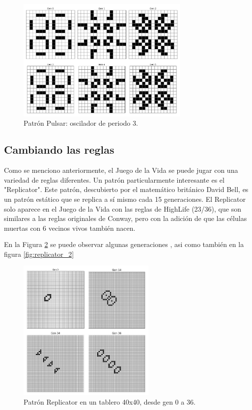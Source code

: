 \documentclass[]{article}
\begin{document}
\begin{figure}[H]
  \centering
  \includegraphics[width=0.75\textwidth]{../assets/oscillator/pulsar/pulsar.png}
  \caption{Patrón Pulsar: oscilador de periodo 3.}
  \label{fig:pulsar}
\end{figure}

\subsection{Cambiando las reglas}
Como se menciono anteriormente, el Juego de la Vida se puede jugar con una variedad de reglas diferentes.
Un patrón particularmente interesante es el "Replicator". Este patrón, descubierto por el matemático británico David Bell, es un patrón estático que se replica a sí mismo cada 15 generaciones. El Replicator solo aparece en el Juego de la Vida con las reglas de HighLife (23/36), que son similares a las reglas originales de Conway, pero con la adición de que las células muertas con 6 vecinos vivos también nacen.

En la Figura \ref{fig:replicator} se puede observar algunas generaciones , asi como también en la figura \ref{fig:replicator_2}
\begin{figure}[H]
\centering
\includegraphics[width=0.6\textwidth]{../assets/special/replicator_1.png}
\caption{Patrón Replicator en un tablero 40x40, desde gen 0 a 36.}
\label{fig:replicator}
\end{figure}
\end{document}
